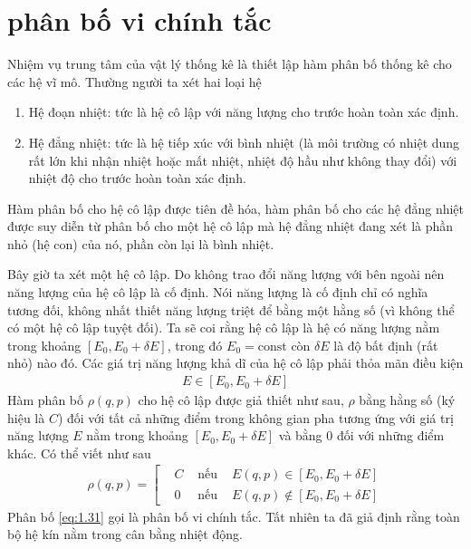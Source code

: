 \section{phân bố vi chính tắc}
	Nhiệm vụ trung tâm của vật lý thống kê là thiết lập hàm phân bố thống kê cho các hệ vĩ mô. Thường người ta xét hai loại hệ
	\begin{enumerate}
		\item Hệ đoạn nhiệt: tức là hệ cô lập với năng lượng cho trước hoàn toàn xác định.
		\item Hệ đẳng nhiệt: tức là hệ tiếp xúc với bình nhiệt (là môi trường có nhiệt dung rất lớn khi nhận nhiệt hoặc mất nhiệt, nhiệt độ hầu như không thay đổi) với nhiệt độ cho trước hoàn toàn xác định.
	\end{enumerate}
	Hàm phân bố cho hệ cô lập được tiên đề hóa, hàm phân bố cho các hệ đẳng nhiệt được suy diễn từ phân bố cho một hệ cô lập mà hệ đẳng nhiệt đang xét là phần nhỏ (hệ con) của nó, phần còn lại là bình nhiệt.
	
	Bây giờ ta xét một hệ cô lập. Do không trao đổi năng lượng với bên ngoài nên năng lượng của hệ cô lập là cố định. Nói năng lượng là cố định chỉ có nghĩa tương đối, không nhất thiết năng lượng triệt để bằng một hằng số (vì không thể có một hệ cô lập tuyệt đối). Ta sẽ coi rằng hệ cô lập là hệ có năng lượng nằm trong khoảng $ \left[E_0, E_0 + \delta E\right] $, trong đó $ E_0 = \mathrm{const} $ còn $ \delta E $ là độ bất định (rất nhỏ) nào đó. Các giá trị năng lượng khả dĩ của hệ cô lập phải thỏa mãn điều kiện
	\begin{align}\label{eq:1.30}
		E \in \left[E_0, E_0 + \delta E\right]
	\end{align}
	Hàm phân bố $ \rho(q,p) $ cho hệ cô lập được giả thiết như sau, $ \rho $ bằng hằng số (ký hiệu là $ C $) đối với tất cả những điểm trong không gian pha tương ứng với giá trị năng lượng $ E $ nằm trong khoảng $ \left[E_0, E_0 + \delta E\right] $ và bằng $ 0 $ đối với những điểm khác. Có thể viết như sau
	\begin{align}\label{eq:1.31}
		\rho (q,p) = \left[\begin{aligned}
		& C & \text{ nếu } & E(q,p) \in \left[E_0, E_0 + \delta E\right]\\
		& 0 & \text{ nếu } & E(q,p) \notin \left[E_0, E_0 + \delta E\right]
		\end{aligned}\right.
	\end{align}
	Phân bố \eqref{eq:1.31} gọi là phân bố vi chính tắc. Tất nhiên ta đã giả định rằng toàn bộ hệ kín nằm trong cân bằng nhiệt động.